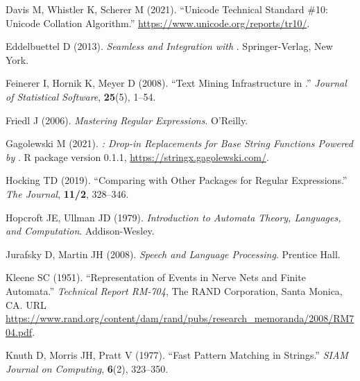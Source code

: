\documentclass[nojss]{jss}
\begin{document}
\begin{thebibliography}{35}
Davis M, Whistler K, Scherer M (2021).
\newblock \enquote{Unicode Technical Standard \#10: Unicode Collation
  Algorithm.}
\newblock \urlprefix\url{https://www.unicode.org/reports/tr10/}.

Eddelbuettel D (2013).
\newblock \emph{Seamless  and  Integration with
  }.
\newblock Springer-Verlag, New York.

Feinerer I, Hornik K, Meyer D (2008).
\newblock \enquote{Text Mining Infrastructure in .}
\newblock \emph{Journal of Statistical Software}, \textbf{25}(5), 1--54.

Friedl J (2006).
\newblock \emph{Mastering Regular Expressions}.
\newblock O'Reilly.

Gagolewski M (2021).
\newblock \emph{: {D}rop-in Replacements for Base 
  String Functions Powered by }.
\newblock R package version 0.1.1,
  \urlprefix\url{https://stringx.gagolewski.com/}.

Hocking TD (2019).
\newblock \enquote{Comparing  with Other 
  Packages for Regular Expressions.}
\newblock \emph{The  Journal}, \textbf{11/2}, 328--346.

Hopcroft JE, Ullman JD (1979).
\newblock \emph{Introduction to Automata Theory, Languages, and Computation}.
\newblock Addison-Wesley.

Jurafsky D, Martin JH (2008).
\newblock \emph{Speech and Language Processing}.
\newblock Prentice Hall.

Kleene SC (1951).
\newblock \enquote{Representation of Events in Nerve Nets and Finite Automata.}
\newblock \emph{Technical Report RM-704}, The RAND Corporation, Santa Monica,
  CA.
\newblock URL
  \url{https://www.rand.org/content/dam/rand/pubs/research_memoranda/2008/RM704.pdf}.

Knuth D, Morris JH, Pratt V (1977).
\newblock \enquote{Fast Pattern Matching in Strings.}
\newblock \emph{SIAM Journal on Computing}, \textbf{6}(2), 323--350.


\end{thebibliography}
\end{document}
